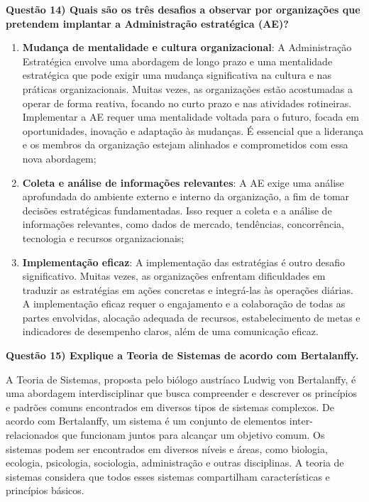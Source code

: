 \documentclass[11pt]{article}
\begin{document}
\noindent \textbf{Questão 14) Quais são os três desafios a observar por organizações que pretendem implantar a Administração estratégica (AE)?}
\begin{enumerate}
    \item \textbf{Mudança de mentalidade e cultura organizacional}: A Administração Estratégica envolve uma abordagem de longo prazo e uma mentalidade estratégica que pode exigir uma mudança significativa na cultura e nas práticas organizacionais. Muitas vezes, as organizações estão acostumadas a operar de forma reativa, focando no curto prazo e nas atividades rotineiras. Implementar a AE requer uma mentalidade voltada para o futuro, focada em oportunidades, inovação e adaptação às mudanças. É essencial que a liderança e os membros da organização estejam alinhados e comprometidos com essa nova abordagem;
    \item \textbf{Coleta e análise de informações relevantes}: A AE exige uma análise aprofundada do ambiente externo e interno da organização, a fim de tomar decisões estratégicas fundamentadas. Isso requer a coleta e a análise de informações relevantes, como dados de mercado, tendências, concorrência, tecnologia e recursos organizacionais;
    \item \textbf{Implementação eficaz}: A implementação das estratégias é outro desafio significativo. Muitas vezes, as organizações enfrentam dificuldades em traduzir as estratégias em ações concretas e integrá-las às operações diárias. A implementação eficaz requer o engajamento e a colaboração de todas as partes envolvidas, alocação adequada de recursos, estabelecimento de metas e indicadores de desempenho claros, além de uma comunicação eficaz.
\end{enumerate}

\noindent \textbf{Questão 15) Explique a Teoria de Sistemas de acordo com Bertalanffy.}\par
A Teoria de Sistemas, proposta pelo biólogo austríaco Ludwig von Bertalanffy, é uma abordagem interdisciplinar que busca compreender e descrever os princípios e padrões comuns encontrados em diversos tipos de sistemas complexos. De acordo com Bertalanffy, um sistema é um conjunto de elementos inter-relacionados que funcionam juntos para alcançar um objetivo comum. Os sistemas podem ser encontrados em diversos níveis e áreas, como biologia, ecologia, psicologia, sociologia, administração e outras disciplinas. A teoria de sistemas considera que todos esses sistemas compartilham características e princípios básicos.\par
\end{document}

